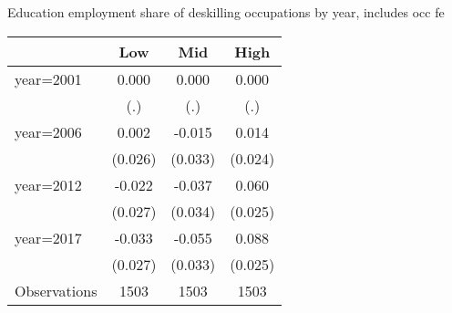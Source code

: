 \begin{center}
\begin{threeparttable}[!h]
\caption{Education employment share of deskilling occupations by year, includes occ fe}
\begin{tabular}{lccc}
\toprule
\toprule
\textbf{}&\multicolumn{1}{c}{\textbf{Low}}&\multicolumn{1}{c}{\textbf{Mid}}&\multicolumn{1}{c}{\textbf{High}} \\
\midrule
year=2001           &       0.000&       0.000&       0.000\\
                    &         (.)&         (.)&         (.)\\
year=2006           &       0.002&      -0.015&       0.014\\
                    &     (0.026)&     (0.033)&     (0.024)\\
year=2012           &      -0.022&      -0.037&       0.060\\
                    &     (0.027)&     (0.034)&     (0.025)\\
year=2017           &      -0.033&      -0.055&       0.088\\
                    &     (0.027)&     (0.033)&     (0.025)\\
Observations        &        1503&        1503&        1503\\
\bottomrule
\bottomrule
\end{tabular}
\end{threeparttable}
\end{center}
